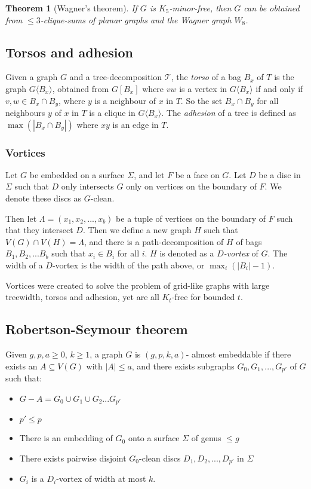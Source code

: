 \documentclass[]{article}
\newcommand{\tree}{\mathcal{T}}
\newtheorem{theorem}{Theorem}
\theoremstyle{definition}
\numberwithin{theorem}{section}
\numberwithin{equation}{section}
\begin{document}
\begin{theorem}[Wagner's theorem]
	If $G$ is $K_5$-minor-free, then $G$ can be obtained from $\leq 3$-clique-sums of planar graphs and the Wagner graph $W_8$.
\end{theorem}


\subsection{Torsos and adhesion}
Given a graph $G$ and a tree-decomposition $\tree$, the \textit{torso} of a bag $B_x$ of $T$ is the graph $G\langle B_x \rangle$, obtained from $G[B_x]$ where $vw$ is a vertex in $G\langle B_x \rangle$ if and only if $v,w \in B_x \cap B_y$, where $y$ is a neighbour of $x$ in $T$. So the set $B_x \cap B_y$ for all neighbours $y$ of $x$ in $T$ is a clique in $G\langle B_x \rangle$. 
The \textit{adhesion} of a tree is defined as $\max(|B_x \cap B_y|)$ where $xy$ is an edge in $T$.

\subsubsection{Vortices}
Let $G$ be embedded on a surface $\Sigma$, and let $F$ be a face on $G$. Let $D$ be a disc in $\Sigma$ such that $D$ only intersects $G$ only on vertices on the boundary of $F$. We denote these discs as $G$-clean. 

Then let $\Lambda = (x_1, x_2, ..., x_b)$ be a tuple of vertices on the boundary of $F$ such that they intersect $D$. Then we define a new graph $H$ such that $V(G) \cap V(H) = \Lambda$, and there is a path-decomposition of $H$ of bags $B_1, B_2, ... B_b$ such that $x_i \in B_i$ for all $i$. $H$ is denoted as a \textit{$D$-vortex} of $G$. The width of a $D$-vortex is the width of the path above, or $\max_i(|B_i| - 1)$. 

Vortices were created to solve the problem of grid-like graphs with large treewidth, torsos and adhesion, yet are all $K_t$-free for bounded $t$. 
\subsection{Robertson-Seymour theorem}
Given $g, p, a \geq 0$, $k \geq 1$, a graph $G$ is $(g, p, k, a)$- almost embeddable if there exists an $A \subseteq V(G)$ with $|A| \leq a$, and there exists subgraphs $G_0, G_1, ...,  G_{p'}$ of $G$ such that:
\begin{itemize}
	\item $G - A = G_0 \cup G_1 \cup G_2 ... G_{p'}$
	\item $p' \leq p$
	\item There is an embedding of $G_0$ onto a surface $\Sigma$ of genus $\leq g$
	\item There exists pairwise disjoint $G_0$-clean discs $D_1, D_2, ..., D_{p'}$ in $\Sigma$
	\item $G_i$ is a $D_i$-vortex of width at most $k$.
\end{itemize}
\end{document}
